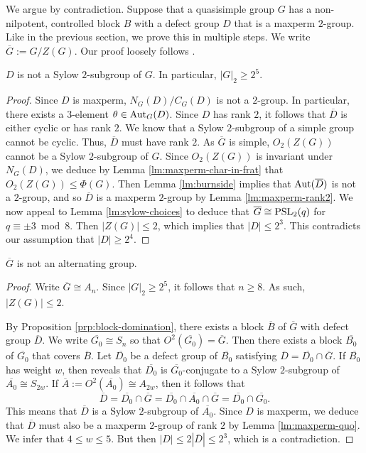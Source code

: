 \documentclass[bysection, amsart]{standard}
\begin{document}
We argue by contradiction. Suppose that a quasisimple group $G$ has a non-nilpotent, controlled block $B$ with a defect group $D$ that is a maxperm $2$-group. Like in the previous section, we prove this in multiple steps. We write $\overline{G} := G/Z(G)$. Our proof loosely follows \cite[Proposition 8]{paper:ekb-block-mna}.
\begin{lemma}
    $D$ is not a Sylow $2$-subgroup of $G$. In particular, $|G|_2 \geq 2^5$.
\end{lemma}
\begin{proof}
    Since $D$ is maxperm, $N_G(D)/C_G(D)$ is not a $2$-group. In particular, there exists a $3$-element $\theta \in \operatorname{Aut}_G(D)$. Since $D$ has rank $2$, it follows that $\overline{D}$ is either cyclic or has rank $2$. We know that a Sylow $2$-subgroup of a simple group cannot be cyclic. Thus, $\overline{D}$ must have rank $2$. As $\overline{G}$ is simple, $O_2(Z(G))$ cannot be a Sylow $2$-subgroup of $G$. Since $O_2(Z(G))$ is invariant under $N_G(D)$, we deduce by Lemma \ref{lm:maxperm-char-in-frat} that $O_2(Z(G)) \leq \Phi(G)$. Then Lemma \ref{lm:burnside} implies that $\operatorname{Aut}(\overline{D})$ is not a $2$-group, and so $\overline{D}$ is a maxperm $2$-group by Lemma \ref{lm:maxperm-rank2}. We now appeal to Lemma \ref{lm:sylow-choices} to deduce that $\overline{G} \cong \operatorname{PSL}_2(q)$ for $q \equiv \pm 3 \bmod{8}$. Then $|Z(G)| \leq 2$, which implies that $|D| \leq 2^3$. This contradicts our assumption that $|D| \geq 2^4$.
\end{proof}
    
\begin{lemma}
    $\overline{G}$ is not an alternating group.
\end{lemma}
\begin{proof}
    Write $\overline{G} \cong A_n$. Since $|G|_2 \geq 2^5$, it follows that $n \geq 8$. As such, $|Z(G)| \leq 2$. 
    
    By Proposition \ref{prp:block-domination}, there exists a block $\overline{B}$ of $\overline{G}$ with defect group $\overline{D}$. We write $\overline{G_0} \cong S_n$ so that $O^2(\overline{G_0}) = \overline{G}$. Then there exists a block $\overline{B_0}$ of $\overline{G_0}$ that covers $\overline{B}$. Let $\overline{D_0}$ be a defect group of $\overline{B_0}$ satisfying $\overline{D} = \overline{D_0} \cap \overline{G}$. If $\overline{B_0}$ has weight $w$, then \cite{book:symmetric} reveals that $\overline{D_0}$ is $\overline{G_0}$-conjugate to a Sylow $2$-subgroup of $\overline{A_0} \cong S_{2w}$. If $\overline{A} := O^2(\overline{A_0}) \cong A_{2w}$, then it follows that
    \[\overline{D} = \overline{D_0} \cap \overline{G} = \overline{D_0} \cap \overline{A_0} \cap \overline{G} = \overline{D_0} \cap \overline{G_0}.\]
    This means that $\overline{D}$ is a Sylow $2$-subgroup of $\overline{A_0}$. Since $D$ is maxperm, we deduce that $\overline{D}$ must also be a maxperm $2$-group of rank $2$ by Lemma \ref{lm:maxperm-quo}. We infer that $4 \leq w \leq 5$. But then $|D| \leq 2|\overline{D}| \leq 2^3$, which is a contradiction.
\end{proof}
\end{document}

